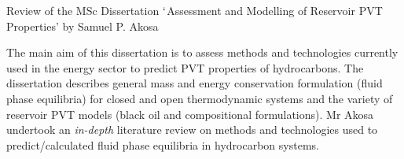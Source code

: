 \documentclass[14pt,twoside]{report}
\begin{document}
\clearpage




\bigskip

\begin{center}
{\Large Review of the MSc Dissertation $\lq$Assessment and Modelling of Reservoir PVT Properties' by Samuel P. Akosa}
\end{center}

\medskip

The main aim of this dissertation is to assess methods and technologies currently used in the energy sector to predict PVT properties of hydrocarbons. The dissertation describes general mass and energy conservation formulation (fluid phase equilibria) for closed and open thermodynamic systems and the variety of reservoir PVT models (black oil and compositional formulations). Mr Akosa undertook an {\it in-depth} literature review on methods and technologies used to predict/calculated fluid phase equilibria in hydrocarbon systems.
\end{document}
